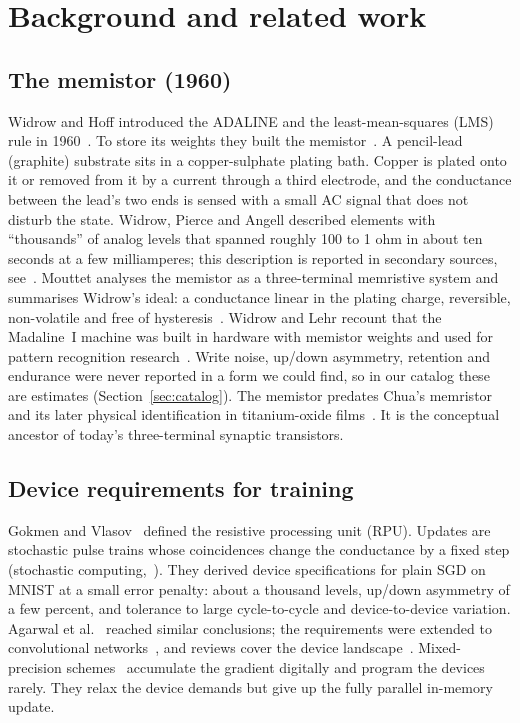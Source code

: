 \section{Background and related work}\label{sec:background}

\subsection{The memistor (1960)}
Widrow and Hoff introduced the ADALINE and the least-mean-squares (LMS) rule in 1960~\cite{widrow1960switching}. To store its
weights they built the memistor~\cite{widrow1960adaline}. A pencil-lead (graphite) substrate sits in a copper-sulphate plating
bath. Copper is plated onto it or removed from it by a current through a third electrode, and the conductance between the
lead's two ends is sensed with a small AC signal that does not disturb the state. Widrow, Pierce and Angell described elements
with ``thousands'' of analog levels that spanned roughly 100 to 1 ohm in about ten seconds at a few milliamperes; this description
is reported in secondary sources, see~\cite{mouttet2010}. Mouttet analyses the memistor as a three-terminal memristive system
and summarises Widrow's ideal: a conductance linear in the plating charge, reversible, non-volatile and free of
hysteresis~\cite{mouttet2010}. Widrow and Lehr recount that the Madaline~I machine was built in hardware with memistor weights and used for pattern
recognition research~\cite{widrow1990}.
Write noise, up/down asymmetry, retention and endurance were never reported in a form we could find, so in our catalog these
are estimates (Section~\ref{sec:catalog}). The memistor predates Chua's memristor~\cite{chua1971} and its later physical
identification in titanium-oxide films~\cite{strukov2008}. It is the conceptual ancestor of today's three-terminal synaptic
transistors.

\subsection{Device requirements for training}
Gokmen and Vlasov~\cite{gokmen2016} defined the resistive processing unit (RPU). Updates are stochastic pulse trains whose
coincidences change the conductance by a fixed step (stochastic computing,~\cite{gaines1967}). They derived device
specifications for plain SGD on MNIST at a small error penalty: about a thousand levels, up/down asymmetry of a few percent, and
tolerance to large cycle-to-cycle and device-to-device variation. Agarwal et al.~\cite{agarwal2016} reached similar conclusions;
the requirements were extended to convolutional networks~\cite{gokmen2017cnn}, and reviews cover the device
landscape~\cite{burr2017,ielmini2018,sebastian2020,haensch2019}. Mixed-precision schemes~\cite{nandakumar2020} accumulate the
gradient digitally and program the devices rarely. They relax the device demands but give up the fully parallel in-memory update.

